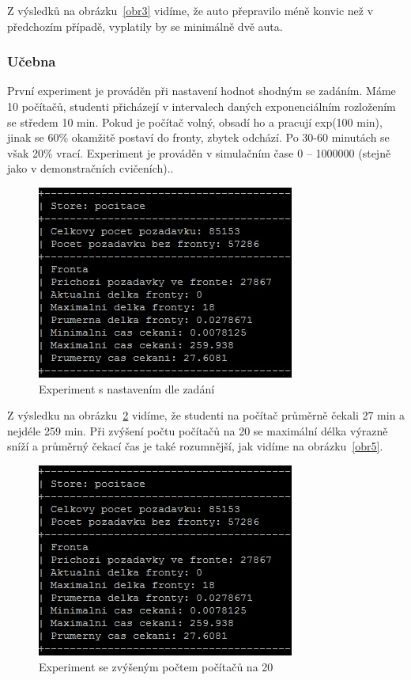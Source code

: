 \documentclass[12pt,a4paper,titlepage,final]{article}
\begin{document}
Z výsledků na obrázku~\ref{obr3} vidíme, že auto přepravilo méně konvic než v předchozím případě, vyplatily by se minimálně dvě auta. 

\subsubsection{Učebna}

První experiment je prováděn při nastavení hodnot shodným se zadáním. Máme 10 počítačů, studenti přicházejí v intervalech daných exponenciálním rozložením se středem 10 min. Pokud je počítač volný, obsadí ho a pracují exp(100 min), jinak se 60\% okamžitě postaví do fronty, zbytek odchází. Po 30-60 minutách se však 20\% vrací. Experiment je prováděn v simulačním čase 0 -- 1000000 (stejně jako v demonstračních cvičeních)..

\begin{figure}[!h] 
 	\centering
	 \includegraphics[]{ucebna1.jpg}
\caption{Experiment s nastavením dle zadání}
\label{obr4}
\end{figure}

Z výsledku na obrázku~\ref{obr4} vidíme, že studenti na počítač průměrně čekali 27 min a nejdéle 259 min. Při zvýšení počtu počítačů na 20 se maximální délka výrazně sníží a průměrný čekací čas je také rozumnější, jak vidíme na obrázku~\ref{obr5}.

\begin{figure}[!h] 
 	\centering
	 \includegraphics[]{ucebna1.jpg}
\caption{Experiment se zvýšeným počtem počítačů na 20}
\label{obr4}
\end{figure}
\end{document}
